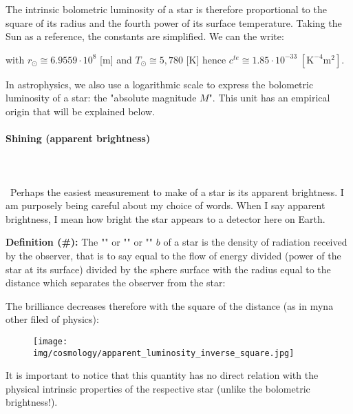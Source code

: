 	The intrinsic bolometric luminosity of a star is therefore proportional to the square of its radius and the fourth power of its surface temperature. Taking the Sun as a reference, the constants are simplified. We can the write:
	
	with $r_{\odot}\cong 6.9559\cdot 10^8$ [m] and $T_{\odot}\cong 5,780$ [K] hence $c^{te}\cong 1.85\cdot 10^{-33}\;[\text{K}^{-4}\text{m}^2]$.
	
	In astrophysics, we also use a logarithmic scale to express the bolometric luminosity of a star: the "absolute magnitude $M$". This unit has an empirical origin that will be explained below.
	
	\paragraph{Shining (apparent brightness)}\mbox{}\\\\\	
	Perhaps the easiest measurement to make of a star is its apparent brightness. I am purposely being careful about my choice of words. When I say apparent brightness, I mean how bright the star appears to a detector here on Earth.
	
	\textbf{Definition (\#\mydef):} The "" or "" or "" $b$ of a star is the density of radiation received by the observer, that is to say equal to the flow of energy divided (power of the star at its surface) divided by the sphere surface with the  radius equal to the distance which separates the observer from the star:
	
	The brilliance decreases therefore with the square of the distance (as in myna other filed of physics):
	\begin{figure}[H]
		\begin{center}
			\texttt{[image: img/cosmology/apparent\_luminosity\_inverse\_square.jpg]}
		\end{center}
	\end{figure}
	It is important to notice that this quantity has no direct relation with the physical intrinsic  properties of the respective star (unlike the bolometric brightness!).
	
